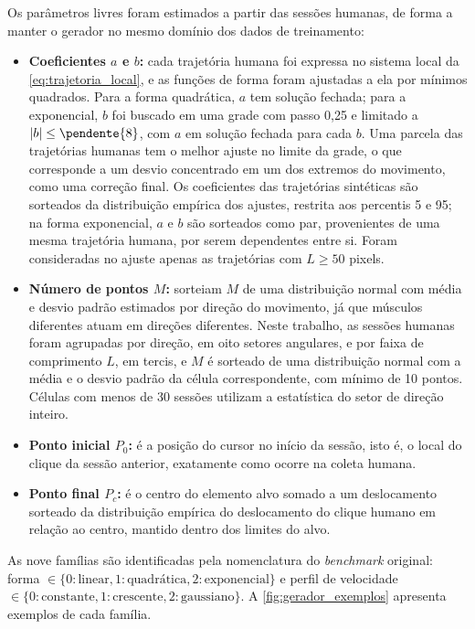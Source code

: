 Os parâmetros livres foram estimados a partir das sessões humanas, de forma a manter o gerador no mesmo domínio dos dados de treinamento:
\begin{itemize}
    \item \textbf{Coeficientes $a$ e $b$:} cada trajetória humana foi expressa no sistema local da \autoref{eq:trajetoria_local}, e as funções de forma foram ajustadas a ela por mínimos quadrados. Para a forma quadrática, $a$ tem solução fechada; para a exponencial, $b$ foi buscado em uma grade com passo 0,25 e limitado a $|b| \le \pendente{8}$, com $a$ em solução fechada para cada $b$. Uma parcela das trajetórias humanas tem o melhor ajuste no limite da grade, o que corresponde a um desvio concentrado em um dos extremos do movimento, como uma correção final. Os coeficientes das trajetórias sintéticas são sorteados da distribuição empírica dos ajustes, restrita aos percentis 5 e 95; na forma exponencial, $a$ e $b$ são sorteados como par, provenientes de uma mesma trajetória humana, por serem dependentes entre si. Foram consideradas no ajuste apenas as trajetórias com $L \geq 50$ pixels.
    \item \textbf{Número de pontos $M$:}  sorteiam $M$ de uma distribuição normal com média e desvio padrão estimados por direção do movimento, já que músculos diferentes atuam em direções diferentes. Neste trabalho, as sessões humanas foram agrupadas por direção, em oito setores angulares, e por faixa de comprimento $L$, em tercis, e $M$ é sorteado de uma distribuição normal com a média e o desvio padrão da célula correspondente, com mínimo de 10 pontos. Células com menos de 30 sessões utilizam a estatística do setor de direção inteiro.
    \item \textbf{Ponto inicial $P_0$:} é a posição do cursor no início da sessão, isto é, o local do clique da sessão anterior, exatamente como ocorre na coleta humana.
    \item \textbf{Ponto final $P_c$:} é o centro do elemento alvo somado a um deslocamento sorteado da distribuição empírica do deslocamento do clique humano em relação ao centro, mantido dentro dos limites do alvo.
\end{itemize}

As nove famílias são identificadas pela nomenclatura do \textit{benchmark} original: forma $\in \{0: \text{linear}, 1: \text{quadrática}, 2: \text{exponencial}\}$ e perfil de velocidade $\in \{0: \text{constante}, 1: \text{crescente}, 2: \text{gaussiano}\}$. A \autoref{fig:gerador_exemplos} apresenta exemplos de cada família.

